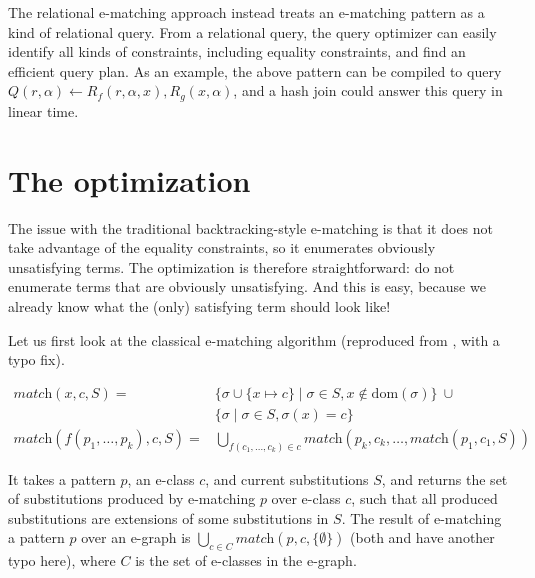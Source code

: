 The relational e-matching approach instead treats an e-matching pattern
 as a kind of relational query.
From a relational query, 
 the query optimizer can easily identify all kinds of constraints, 
 including equality constraints,
 and find an efficient query plan.
As an example,
 the above pattern can be compiled to query
 \(Q(r, \alpha)\gets R_f(r, \alpha,x),R_g(x,\alpha)\), 
 and a hash join could answer this query in linear time.

\section{The optimization}\label{the-optimization}

The issue with the traditional backtracking-style e-matching 
 is that it does not take advantage of the equality constraints, 
 so it enumerates obviously unsatisfying terms.
The optimization is therefore straightforward: 
 do not enumerate terms that are obviously unsatisfying.
And this is easy, because we already know what the (only) satisfying
 term should look like!

Let us first look at the classical e-matching algorithm 
 (reproduced from \citet[Figure~3]{relational-ematching}, with a typo fix).

\begin{align*}
    \textit{match}(x,c,S) = 
                   & \{ \sigma \cup \{ x \mapsto c\} \mid \sigma \in S, x \not \in \text{dom}(\sigma)\}\ \cup\\
                   & \{ \sigma \mid \sigma \in S, \sigma(x) = c \}\\
    \textit{match}(f(p_{1}, \dots, p_{k}), c, S) = 
                   & \bigcup_{f(c_{1},\dots,c_{k})\in c}
                     \textit{match}(p_{k}, c_{k}, \dots, \textit{match}(p_{1}, c_{1}, S))
\end{align*}

It takes a pattern \(p\), an e-class \(c\), 
 and current substitutions \(S\),
 and returns the set of substitutions produced by e-matching \(p\)
 over e-class \(c\),
 such that all produced substitutions are extensions
 of some substitutions in \(S\).
The result of e-matching a pattern \(p\)
 over an e-graph is
 \(\bigcup_{c\in C} \textit{match}(p, c, \{\emptyset\})\)
 (both \citet{relational-ematching} and \citet{efficient-ematching}
 have another typo here), where \(C\) is the
 set of e-classes in the e-graph.

